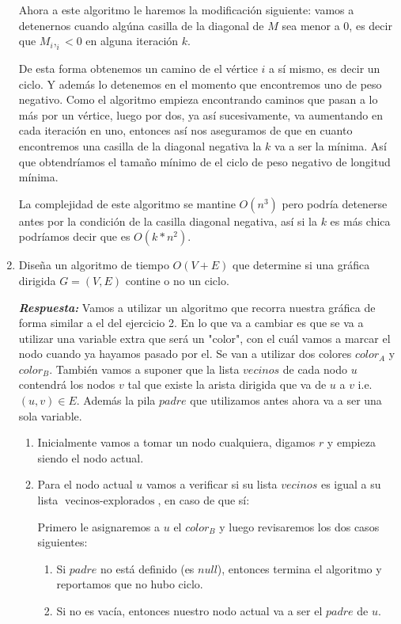 \documentclass[11pt,letterpaper]{article}
\newcommand\respuesta{\textbf{\textit{Respuesta: }}}
\begin{document}
\begin{enumerate}[leftmargin=*]
    Ahora a este algoritmo le haremos la modificación siguiente: vamos a detenernos cuando algúna casilla de la diagonal de $M$ sea menor a $0$, es decir que $M_i,_i < 0$ en alguna iteración $k$.

    De esta forma obtenemos un camino de el vértice $i$ a sí mismo, es decir un ciclo.
    Y además lo detenemos en el momento que encontremos uno de peso negativo.
    Como el algoritmo empieza encontrando caminos que pasan a lo más por un vértice, luego por dos, ya así sucesivamente, va aumentando en cada iteración en uno, entonces así nos aseguramos de que en cuanto encontremos una casilla de la diagonal negativa la $k$ va a ser la mínima.
    Así que obtendríamos el tamaño mínimo de el ciclo de peso negativo de longitud mínima.

    La complejidad de este algoritmo se mantine $O(n^3)$ pero podría detenerse antes por la condición de la casilla diagonal negativa, así si la $k$ es más chica podríamos decir que es $O(k*n^2)$.

    \item Diseña un algoritmo de tiempo $O(V+E)$ que determine si una gráfica dirigida $G = (V,E)$ contine o no un ciclo.
    
    \respuesta Vamos a utilizar un algoritmo que recorra nuestra gráfica de forma similar a el del ejercicio 2.
    En lo que va a cambiar es que se va a utilizar una variable extra que será un "color", con el cuál vamos a marcar el nodo cuando ya hayamos pasado por el.
    Se van a utilizar dos colores $color_A$ y $color_B$.
    También vamos a suponer que la lista $vecinos$ de cada nodo $u$ contendrá los nodos $v$ tal que existe la arista dirigida que va de $u$ a $v$ i.e. $(u,v) \in E$. 
    Además la pila $padre$ que utilizamos antes ahora va a ser una sola variable.

    \begin{enumerate}[label=\roman*)]
      \item Inicialmente vamos a tomar un nodo cualquiera, digamos $r$ y empieza siendo el nodo actual.
    
      \item Para el nodo actual $u$ vamos a verificar si su lista $vecinos$ es igual a su lista $\operatorname{vecinos-explorados}$, en caso de que sí:
      
      Primero le asignaremos a $u$ el $color_B$ y luego revisaremos los dos casos siguientes:
      \begin{enumerate}[label=\alph*)]
        \item Si $padre$ no está definido (es $null$), entonces termina el algoritmo y reportamos que no hubo ciclo. 
        \item Si no es vacía, entonces nuestro nodo actual va a ser el $padre$ de $u$.
      \end{enumerate}


\end{enumerate}
\end{enumerate}
\end{document}
